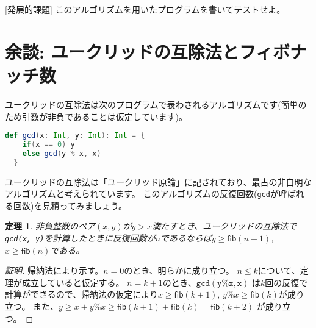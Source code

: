 \documentclass[a4paper,twoside,onecolumn,openany,article]{memoir}
\theoremstyle{plain}
\newtheorem{theorem}{定理}
\theoremstyle{remark}
\begin{document}
[発展的課題] このアルゴリズムを用いたプログラムを書いてテストせよ。

\section*{余談: ユークリッドの互除法とフィボナッチ数}
ユークリッドの互除法は次のプログラムで表わされるアルゴリズムです(簡単のため引数が非負であることは仮定しています)。
\begin{lstlisting}[basicstyle=\ttfamily\normalsize,showstringspaces=false,language=scala]
  def gcd(x: Int, y: Int): Int = {
    if(x == 0) y
    else gcd(y % x, x)
  }
\end{lstlisting}
ユークリッドの互除法は「ユークリッド原論」に記されており、最古の非自明なアルゴリズムと考えられています。
このアルゴリズムの反復回数(\texttt{gcd}が呼ばれる回数)を見積ってみましょう。
\begin{theorem}
非負整数のペア$(x,y)$が$y> x$満たすとき、ユークリッドの互除法で\texttt{gcd(x, y)}を計算したときに反復回数が$n$であるならば$y\ge\mathsf{fib}(n+1)$, $x\ge\mathsf{fib}(n)$である。
\end{theorem}
\begin{proof}[証明]
帰納法により示す。$n=0$のとき、明らかに成り立つ。
$n\le k$について、定理が成立していると仮定する。
$n=k+1$のとき、$\mathtt{gcd(y \% x, x)}$ は$k$回の反復で計算ができるので、帰納法の仮定により$x\ge\mathsf{fib}(k+1)$, $y \% x \ge \mathsf{fib}(k)$が成り立つ。
また、$y\ge x + y \% x\ge \mathsf{fib}(k+1) + \mathsf{fib}(k) = \mathsf{fib}(k+2)$ が成り立つ。
\end{proof}
\end{document}
